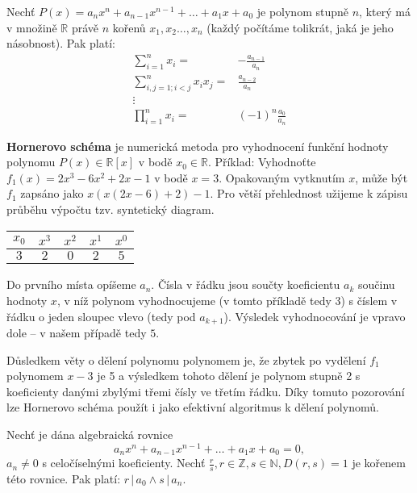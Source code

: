 \begin{veta}
  Nechť $P(x)=a_nx^n+a_{n-1}x^{n-1}+\dots + a_1x+a_0$ je polynom stupně $n$, který má v množině $\mathbb R$ právě $n$ kořenů $x_1,x_2\dots,x_n$ (každý počítáme tolikrát, jaká je jeho násobnost). Pak platí:
  \begin{align*}
    \sum_{i=1}^n x_i = & -\frac{a_{n-1}}{a_n} \\
    \sum_{i,j=1; i<j}^{n}x_ix_j= & \frac{a_{n-2}}{a_n} \\
    \vdots & \\
    \prod_{i=1}^nx_i=&(-1)^n\frac{a_0}{a_n}
  \end{align*}
\end{veta}

\begin{pozn}
  \textbf{Hornerovo schéma} je numerická metoda pro vyhodnocení funkční hodnoty polynomu $P(x) \in \mathbb R [x]$ v bodě $ x_0 \in \mathbb R$. Příklad:
  Vyhodnoťte $f_{1}(x)=2x^{3}-6x^{2}+2x-1$ v bodě $x=3$.
  Opakovaným vytknutím $x$, může být $f_{1}$ zapsáno jako $x(x(2x-6)+2)-1$. Pro větší přehlednost užijeme k zápisu průběhu výpočtu tzv. syntetický diagram.
  \begin{center}
    \begin{tabular}{ c|c c c c }
        $x_{0}$ & $x^{3}$ & $x^{2}$ & $x^{1}$ & $x^{0}$\\
        \hline
        $3$ & $2$ & $0$ & $2$ & $5$
    \end{tabular}
  \end{center}
  Do prvního místa opíšeme $a_n$. Čísla v řádku jsou součty koeficientu $a_k$ součinu hodnoty $x$, v níž polynom vyhodnocujeme (v tomto příkladě tedy $3$) s číslem v řádku o jeden sloupec vlevo (tedy pod $a_{k+1}$). Výsledek vyhodnocování je vpravo dole – v našem případě tedy $5$.

  Důsledkem věty o dělení polynomu polynomem je, že zbytek po vydělení $f_1$ polynomem $x-3$ je 5 a výsledkem tohoto dělení je polynom stupně 2 s koeficienty danými zbylými třemi čísly ve třetím řádku. Díky tomuto pozorování lze Hornerovo schéma použít i jako efektivní algoritmus k dělení polynomů.
\end{pozn}

\begin{veta}
    Nechť je dána algebraická rovnice
    \begin{equation}\label{alg_rce}
        a_nx^n + a_{n-1}x^{n-1}+\dots + a_1x+a_0=0,
    \end{equation}
    $a_n \ne 0$ s celočíselnými koeficienty. Nechť $\frac{r}{s}, r\in \mathbb Z, s \in \mathbb N, D(r,s)=1$ je kořenem této rovnice.
    Pak platí: $r \, | \, a_0 \land s \, |\, a_n.$
\end{veta}

